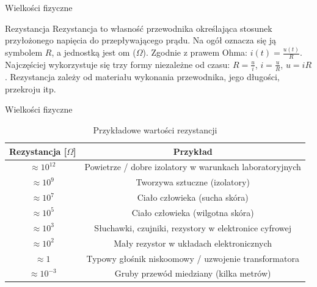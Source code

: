 \begin{frame}{Wielkości fizyczne}
	\begin{block}{Rezystancja}
		Rezystancja to własność przewodnika określająca stosunek przyłożonego napięcia do przepływającego prądu.
		Na ogół oznacza się ją symbolem $R$, a jednostką jest om ($\Omega$).
		Zgodnie z prawem Ohma: $i(t) = \tfrac{u(t)}{R}$.
		Najczęściej wykorzystuje się trzy formy niezależne od czasu:
		$R = \tfrac{u}{i}$, \; $i = \tfrac{u}{R}$, \; $u = iR$.
		Rezystancja zależy od materiału wykonania przewodnika, jego długości, przekroju itp.
	\end{block}
\end{frame}

\begin{frame}{Wielkości fizyczne}
	\begin{table}
		\centering
		\caption{Przykładowe wartości rezystancji}
		\begin{tabular}{|c|c|}
			\hline
			Rezystancja [$\Omega$] & Przykład                                                \\ \hline
			$\approx 10^{12}$      & Powietrze / dobre izolatory w warunkach laboratoryjnych \\ \hline
			$\approx 10^{9}$       & Tworzywa sztuczne (izolatory)                           \\ \hline
			$\approx 10^{7}$       & Ciało człowieka (sucha skóra)                           \\ \hline
			$\approx 10^{5}$       & Ciało człowieka (wilgotna skóra)                        \\ \hline
			$\approx 10^{3}$       & Słuchawki, czujniki, rezystory w elektronice cyfrowej   \\ \hline
			$\approx 10^{2}$       & Mały rezystor w układach elektronicznych                \\ \hline
			$\approx 1$            & Typowy głośnik niskoomowy / uzwojenie transformatora    \\ \hline
			$\approx 10^{-3}$      & Gruby przewód miedziany (kilka metrów)                  \\ \hline
		\end{tabular}
	\end{table}
\end{frame}

